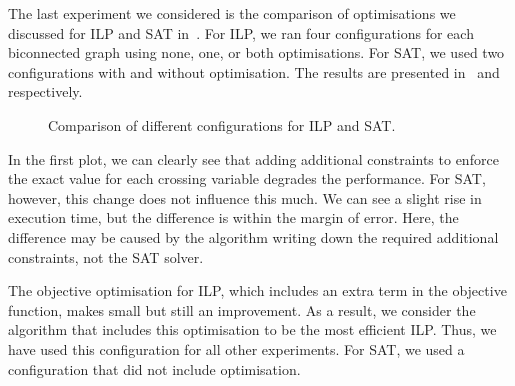 The last experiment we considered is the comparison of optimisations we discussed for \textsf{ILP} and \textsf{SAT} in~. For \textsf{ILP}, we ran four configurations for each biconnected graph using none, one, or both optimisations. For \textsf{SAT}, we used two configurations with and without optimisation. The results are presented in~ and~ respectively.

\begin{figure}
    \centering
    \hfill
    \caption{Comparison of different configurations for \textsf{ILP} and \textsf{SAT}.}
\end{figure}

In the first plot, we can clearly see that adding additional constraints to enforce the exact value for each crossing variable degrades the performance. For \textsf{SAT}, however, this change does not influence this much. We can see a slight rise in execution time, but the difference is within the margin of error. Here, the difference may be caused by the algorithm writing down the required additional constraints, not the SAT solver.

The objective optimisation for \textsf{ILP}, which includes an extra term in the objective function, makes small but still an improvement. As a result, we consider the algorithm that includes this optimisation to be the most efficient \textsf{ILP}. Thus, we have used this configuration for all other experiments. For \textsf{SAT}, we used a configuration that did not include optimisation.
